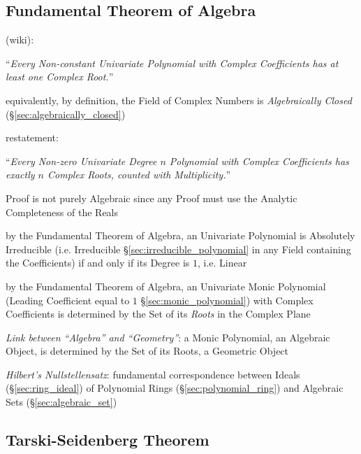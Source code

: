 \subsection{Fundamental Theorem of Algebra}
\label{sec:fundamental_algebra_theorem}

(wiki):

``\emph{Every Non-constant Univariate Polynomial with Complex Coefficients
has at least one Complex Root.}''

equivalently, by definition, the Field of Complex Numbers is
\emph{Algebraically Closed} (\S\ref{sec:algebraically_closed})

restatement:

``\emph{Every Non-zero Univariate Degree $n$ Polynomial with Complex
Coefficients has exactly $n$ Complex Roots, counted with Multiplicity.}''

Proof is not purely Algebraic since any Proof must use the Analytic Completeness
of the Reals

by the Fundamental Theorem of Algebra, an Univariate Polynomial is Absolutely
Irreducible (i.e. Irreducible \S\ref{sec:irreducible_polynomial} in any Field
containing the Coefficients) if and only if its Degree is $1$, i.e. Linear

by the Fundamental Theorem of Algebra, an Univariate Monic Polynomial
(Leading Coefficient equal to $1$ \S\ref{sec:monic_polynomial}) with Complex
Coefficients is determined by the Set of its \emph{Roots} in the Complex Plane

\emph{Link between ``Algebra'' and ``Geometry''}: a Monic Polynomial, an
Algebraic Object, is determined by the Set of its Roots, a Geometric Object

\emph{Hilbert's Nullstellensatz}: fundamental correspondence between Ideals
(\S\ref{sec:ring_ideal}) of Polynomial Rings (\S\ref{sec:polynomial_ring}) and
Algebraic Sets (\S\ref{sec:algebraic_set})



\subsection{Tarski-Seidenberg Theorem}\label{sec:tarski_seidenberg}

